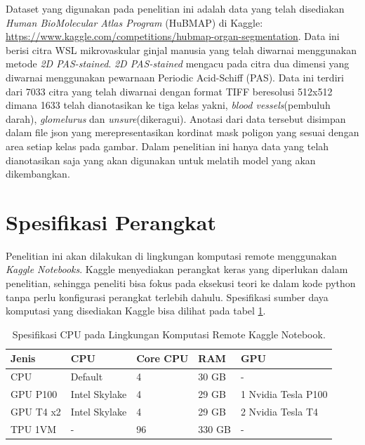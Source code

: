\noindent Dataset yang digunakan pada penelitian ini adalah data yang telah disediakan \textit{Human BioMolecular Atlas Program }(HuBMAP) di Kaggle: \url{https://www.kaggle.com/competitions/hubmap-organ-segmentation}\cite{hubmap-hacking}.  Data ini berisi citra WSL mikrovaskular ginjal manusia yang telah diwarnai menggunakan metode \textit{2D PAS-stained}. \textit{2D PAS-stained} mengacu pada citra dua dimensi yang diwarnai menggunakan pewarnaan Periodic Acid-Schiff (PAS). Data ini terdiri dari 7033 citra yang telah diwarnai dengan format TIFF beresolusi 512x512 dimana 1633 telah dianotasikan ke tiga kelas yakni, \textit{blood vessels}(pembuluh darah), \textit{glomelurus} dan \textit{unsure}(dikeragui).  Anotasi dari data tersebut disimpan dalam file json yang merepresentasikan kordinat mask poligon yang sesuai dengan area setiap kelas pada gambar. Dalam penelitian ini hanya data yang telah dianotasikan saja yang akan digunakan untuk melatih model yang akan dikembangkan.



\section{Spesifikasi Perangkat}

\noindent Penelitian ini akan dilakukan di lingkungan komputasi remote menggunakan \textit{Kaggle Notebooks}. Kaggle menyediakan perangkat keras yang diperlukan dalam penelitian, sehingga peneliti bisa fokus pada eksekusi teori ke dalam kode python tanpa perlu konfigurasi perangkat terlebih dahulu. Spesifikasi sumber daya komputasi yang disediakan Kaggle bisa dilihat pada tabel \ref{tab:cpu_specs}.
\begin{table}[h]
	\caption{Spesifikasi CPU pada Lingkungan Komputasi Remote Kaggle Notebook.} %
	\label{tab:cpu_specs}
	\begin{tabular}{lllll}
		\hline
		\textbf{Jenis} & \textbf{CPU}                             & \textbf{Core CPU} & \textbf{RAM} & \textbf{GPU}        \\ \hline
		CPU            & Default & 4                 & 30 GB        & -                   \\ \hline
		GPU P100       & Intel Skylake                            & 4                 & 29 GB        & 1 Nvidia Tesla P100 \\ \hline
		GPU T4 x2      & Intel Skylake                            & 4                 & 29 GB        & 2 Nvidia Tesla T4   \\ \hline
		TPU 1VM        & -                                        & 96                & 330 GB       & -                   \\ \hline
	\end{tabular}
\end{table}

